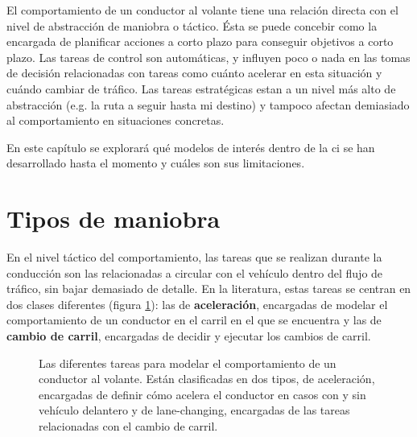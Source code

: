 El comportamiento de un conductor al volante tiene una relación directa con el nivel de abstracción de maniobra o táctico. Ésta se puede concebir como la encargada de planificar acciones a corto plazo para conseguir objetivos a corto plazo. Las tareas de control son automáticas, y influyen poco o nada en las tomas de decisión relacionadas con tareas como cuánto acelerar en esta situación y cuándo cambiar de tráfico. Las tareas estratégicas estan a un nivel más alto de abstracción (e.g. la ruta a seguir hasta mi destino) y tampoco afectan demiasiado al comportamiento en situaciones concretas.

En este capítulo se explorará qué modelos de interés dentro de la \gls{ci} se han desarrollado hasta el momento y cuáles son sus limitaciones.

\section{Tipos de maniobra}

En el nivel táctico del comportamiento, las tareas que se realizan durante la conducción son las relacionadas a circular con el vehículo dentro del flujo de tráfico, sin bajar demasiado de detalle. En la literatura, estas tareas se centran en dos clases diferentes (figura \ref{fig:behavior-model-classification}): las de \textbf{aceleración}, encargadas de modelar el comportamiento de un conductor en el carril en el que se encuentra y las de \textbf{cambio de carril}, encargadas de decidir y ejecutar los cambios de carril.

\begin{figure}
	\centering
	\caption{Las diferentes tareas para modelar el comportamiento de un conductor al volante. Están clasificadas en dos tipos, de aceleración, encargadas de definir cómo acelera el conductor en casos con y sin vehículo delantero y de lane-changing, encargadas de las tareas relacionadas con el cambio de carril.}
	\label{fig:behavior-model-classification}
\end{figure}

